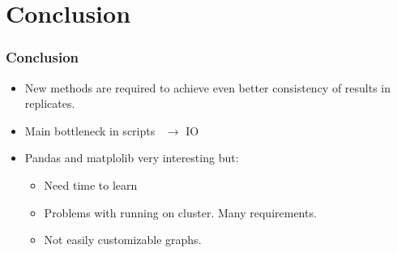 \documentclass{beamer}
\begin{document}
\section{Conclusion} %
\label{sec:conclusion}
\begin{frame}
\frametitle{Conclusion}
\begin{itemize}
	\item New methods are required to achieve even better
	consistency of results in replicates.
	\item Main bottleneck in scripts ~$\rightarrow$ IO
	\item Pandas and matplolib very interesting but:
	      \begin{itemize}
	      	\item Need time to learn
	      	\item Problems with running on cluster. Many requirements.
	      	\item Not easily customizable graphs.
	      \end{itemize}
\end{itemize}
\end{frame}









\end{document}

